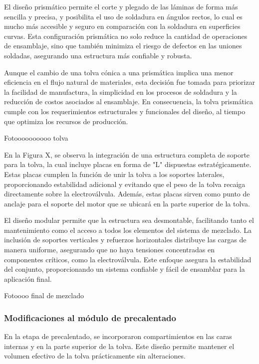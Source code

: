 \documentclass[14pt,oneside]{extarticle} %
\begin{document}
El diseño prismático permite el corte y plegado de las láminas de forma más sencilla y precisa, y posibilita el uso de soldadura en ángulos rectos, lo cual es mucho más accesible y seguro en comparación con la soldadura en superficies curvas. Esta configuración prismática no solo reduce la cantidad de operaciones de ensamblaje, sino que también minimiza el riesgo de defectos en las uniones soldadas, asegurando una estructura más confiable y robusta.

Aunque el cambio de una tolva cónica a una prismática implica una menor eficiencia en el flujo natural de materiales, esta decisión fue tomada para priorizar la facilidad de manufactura, la simplicidad en los procesos de soldadura y la reducción de costos asociados al ensamblaje. En consecuencia, la tolva prismática cumple con los requerimientos estructurales y funcionales del diseño, al tiempo que optimiza los recursos de producción.

Fotoooooooooo tolva

En la Figura X, se observa la integración de una estructura completa de soporte para la tolva, la cual incluye placas en forma de "L" dispuestas estratégicamente. Estas placas cumplen la función de unir la tolva a los soportes laterales, proporcionando estabilidad adicional y evitando que el peso de la tolva recaiga directamente sobre la electroválvula. Además, estas placas sirven como punto de anclaje para el soporte del motor que se ubicará en la parte superior de la tolva.

El diseño modular permite que la estructura sea desmontable, facilitando tanto el mantenimiento como el acceso a todos los elementos del sistema de mezclado. La inclusión de soportes verticales y refuerzos horizontales distribuye las cargas de manera uniforme, asegurando que no haya tensiones concentradas en componentes críticos, como la electroválvula. Este enfoque asegura la estabilidad del conjunto, proporcionando un sistema confiable y fácil de ensamblar para la aplicación final.

Fotoooo final de mezclado

\subsubsection{Modificaciones al módulo de precalentado}
En la etapa de precalentado, se incorporaron compartimientos en las caras internas y en la parte superior de la tolva. Este diseño permite mantener el volumen efectivo de la tolva prácticamente sin alteraciones.
\end{document}
